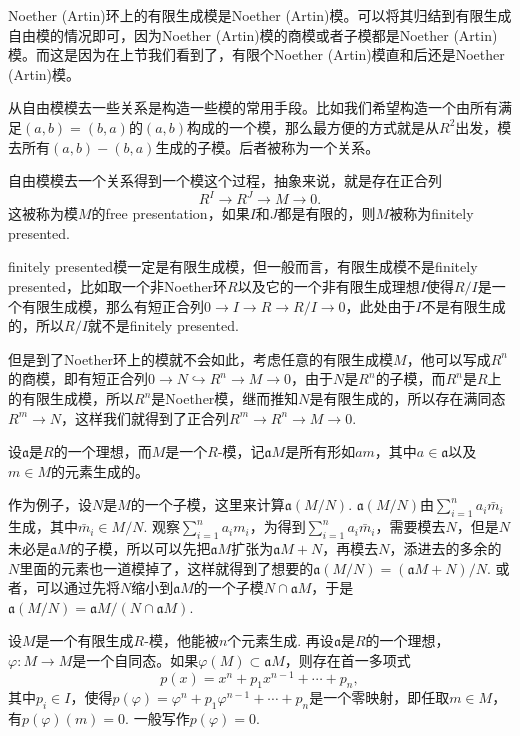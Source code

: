 \para Noether (Artin)环上的有限生成模是Noether (Artin)模。可以将其归结到有限生成自由模的情况即可，因为Noether (Artin)模的商模或者子模都是Noether (Artin)模。而这是因为在上节我们看到了，有限个Noether (Artin)模直和后还是Noether (Artin)模。

\para 从自由模模去一些关系是构造一些模的常用手段。比如我们希望构造一个由所有满足$(a,b)=(b,a)$的$(a,b)$构成的一个模，那么最方便的方式就是从$R^2$出发，模去所有$(a,b)-(b,a)$生成的子模。后者被称为一个关系。

自由模模去一个关系得到一个模这个过程，抽象来说，就是存在正合列
\[
	R^I\to R^J \to M\to 0.
\]
这被称为模$M$的free presentation，如果$I$和$J$都是有限的，则$M$被称为finitely presented.

finitely presented模一定是有限生成模，但一般而言，有限生成模不是finitely presented，比如取一个非Noether环$R$以及它的一个非有限生成理想$I$使得$R/I$是一个有限生成模，那么有短正合列$0\to I\to R \to R/I\to 0$，此处由于$I$不是有限生成的，所以$R/I$就不是finitely presented.

但是到了Noether环上的模就不会如此，考虑任意的有限生成模$M$，他可以写成$R^n$的商模，即有短正合列$0\to N \hookrightarrow R^n \to M\to 0$，由于$N$是$R^n$的子模，而$R^n$是$R$上的有限生成模，所以$R^n$是Noether模，继而推知$N$是有限生成的，所以存在满同态$R^m\to N$，这样我们就得到了正合列$R^m\to R^n\to M\to 0$.

\para 设$\mathfrak{a}$是$R$的一个理想，而$M$是一个$R$-模，记$\mathfrak{a}M$是所有形如$am$，其中$a\in \mathfrak{a}$以及$m\in M$的元素生成的。

作为例子，设$N$是$M$的一个子模，这里来计算$\mathfrak{a}(M/N)$. $\mathfrak{a}(M/N)$由$\sum_{i=1}^n a_i\bar{m}_i$生成，其中$\bar{m}_i\in M/N$. 观察$\sum_{i=1}^n a_i m_i$，为得到$\sum_{i=1}^n a_i\bar{m}_i$，需要模去$N$，但是$N$未必是$\mathfrak{a}M$的子模，所以可以先把$\mathfrak{a}M$扩张为$\mathfrak{a}M+N$，再模去$N$，添进去的多余的$N$里面的元素也一道模掉了，这样就得到了想要的$\mathfrak{a}(M/N)=(\mathfrak{a}M+N)/N$. 或者，可以通过先将$N$缩小到$\mathfrak{a}M$的一个子模$N\cap \mathfrak{a}M$，于是$\mathfrak{a}(M/N)=\mathfrak{a}M/(N\cap \mathfrak{a}M)$.

\begin{thm}
设$M$是一个有限生成$R$-模，他能被$n$个元素生成. 再设$\mathfrak{a}$是$R$的一个理想，$\varphi:M\to M$是一个自同态。如果$\varphi(M)\subset \mathfrak{a}M$，则存在首一多项式
\[
	p(x)=x^n+p_1x^{n-1}+\cdots+p_n,
\]
其中$p_i\in I$，使得$p(\varphi)=\varphi^n+p_1\varphi^{n-1}+\cdots+p_n$是一个零映射，即任取$m\in M$，有$p(\varphi)(m)=0$. 一般写作$p(\varphi)=0$.
\end{thm}

